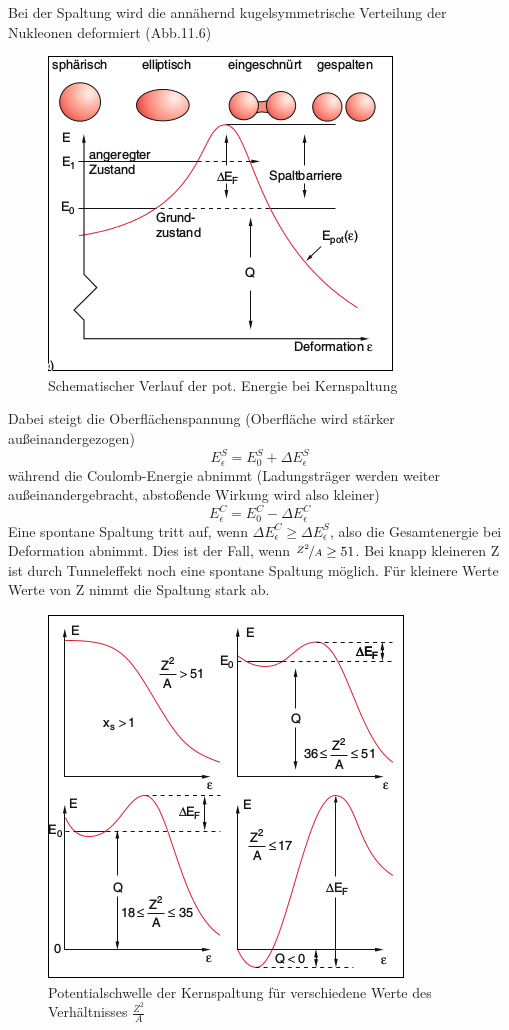 \documentclass[Ex4_Zusammenfassung.tex]{subfiles}
\begin{document}
Bei der Spaltung wird die annähernd kugelsymmetrische Verteilung der Nukleonen deformiert (Abb.11.6)
\begin{figure}[H]
\includegraphics[scale=0.7]{Kernspaltung.png}
\caption{Schematischer Verlauf der pot. Energie bei Kernspaltung}
\end{figure}
Dabei steigt die Oberflächenspannung (Oberfläche wird stärker außeinandergezogen) 
\begin{equation}
E_{\epsilon}^S = E_0^S + \Delta E_{\epsilon}^S
\end{equation}
während die Coulomb-Energie abnimmt (Ladungsträger werden weiter außeinandergebracht, abstoßende Wirkung wird also kleiner)
\begin{equation}
E_{\epsilon}^C = E_0^C - \Delta E_{\epsilon}^C
\end{equation}
Eine spontane Spaltung tritt auf, wenn $\Delta E_{\epsilon}^C \geq \Delta E_{\epsilon}^S$, also die Gesamtenergie bei Deformation abnimmt. Dies ist der Fall, wenn $\nicefrac{Z^2}{A} \geq 51$. Bei knapp kleineren Z  ist durch Tunneleffekt noch eine spontane Spaltung möglich. Für kleinere Werte Werte von Z nimmt die Spaltung stark ab. 
\begin{figure}[H]
\includegraphics[scale=0.8]{Kernspaltung_Abnahme.png}
\caption{Potentialschwelle der Kernspaltung für verschiedene Werte des Verhältnisses $\frac{Z^2}{A}$}
\end{figure}
\end{document}
